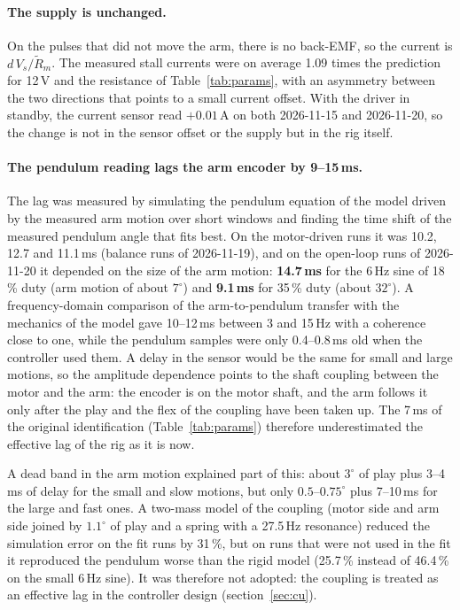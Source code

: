 \documentclass[a4paper,11pt]{article}
\begin{document}
\paragraph{The supply is unchanged.} On the pulses that did not move the arm, there is no back-EMF, so the current is $d\,V_s/\tilde R_m$. The measured stall currents were on average 1.09 times the prediction for 12\,V and the resistance of Table~\ref{tab:params}, with an asymmetry between the two directions that points to a small current offset. With the driver in standby, the current sensor read $+0.01$\,A on both 2026-11-15 and 2026-11-20, so the change is not in the sensor offset or the supply but in the rig itself.

\paragraph{The pendulum reading lags the arm encoder by 9--15\,ms.} The lag was measured by simulating the pendulum equation of the model driven by the measured arm motion over short windows and finding the time shift of the measured pendulum angle that fits best. On the motor-driven runs it was 10.2, 12.7 and 11.1\,ms (balance runs of 2026-11-19), and on the open-loop runs of 2026-11-20 it depended on the size of the arm motion: \textbf{14.7\,ms} for the 6\,Hz sine of 18\,\% duty (arm motion of about $7^\circ$) and \textbf{9.1\,ms} for 35\,\% duty (about $32^\circ$). A frequency-domain comparison of the arm-to-pendulum transfer with the mechanics of the model gave 10--12\,ms between 3 and 15\,Hz with a coherence close to one, while the pendulum samples were only 0.4--0.8\,ms old when the controller used them. A delay in the sensor would be the same for small and large motions, so the amplitude dependence points to the shaft coupling between the motor and the arm: the encoder is on the motor shaft, and the arm follows it only after the play and the flex of the coupling have been taken up. The 7\,ms of the original identification (Table~\ref{tab:params}) therefore underestimated the effective lag of the rig as it is now.

A dead band in the arm motion explained part of this: about $3^\circ$ of play plus 3--4\,ms of delay for the small and slow motions, but only $0.5$--$0.75^\circ$ plus 7--10\,ms for the large and fast ones. A two-mass model of the coupling (motor side and arm side joined by $1.1^\circ$ of play and a spring with a 27.5\,Hz resonance) reduced the simulation error on the fit runs by 31\,\%, but on runs that were not used in the fit it reproduced the pendulum worse than the rigid model (25.7\,\% instead of 46.4\,\% on the small 6\,Hz sine). It was therefore not adopted: the coupling is treated as an effective lag in the controller design (section~\ref{sec:cu}).
\end{document}
